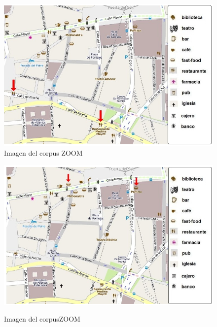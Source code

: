 \begin{figure}
\begin{minipage}[b]{0.5\linewidth}
\centering
\includegraphics[width=\textwidth]{images/corpus/mapa11.png}\\[0pt]
\caption{Imagen del corpus ZOOM}
\label{mapa11}
\end{minipage}
\hspace*{0cm}
\begin{minipage}[b]{0.5\linewidth}
\centering
\includegraphics[width=\textwidth]{images/corpus/mapa12.png}\\[0pt]
\caption{Imagen del corpusZOOM}
\label{mapa12}
\end{minipage}
\end{figure}

